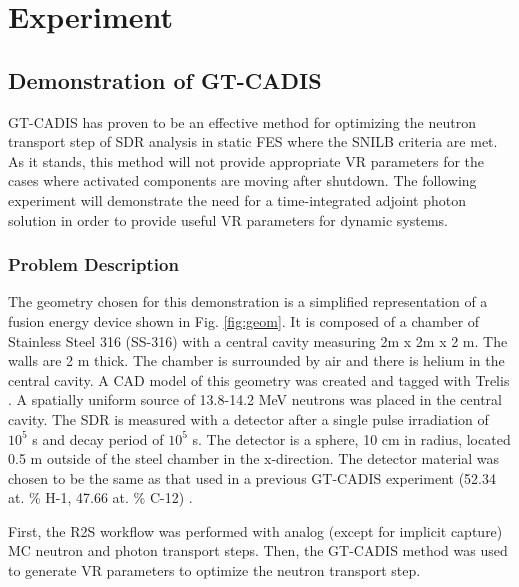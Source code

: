 \graphicspath{{/home/chelsea/prelim/src/figs}}

\chapter{Experiment} \label{ch:exp}

\section{Demonstration of GT-CADIS} \label{sec:gtcadis}
GT-CADIS has proven to be an effective method 
for optimizing the neutron transport step of 
SDR analysis in static FES where the SNILB criteria are met.  As it stands, this method
will not provide appropriate VR parameters for the cases where activated
components are moving
after shutdown.  The following experiment will demonstrate the need for a
time-integrated adjoint photon solution in order to provide useful VR parameters for
dynamic systems.

\subsection{Problem Description} \label{sec:description}
The geometry chosen for this demonstration is a simplified representation of a 
fusion energy device shown in Fig. \ref{fig:geom}.
It is composed of a chamber of Stainless Steel 316 (SS-316) with a central cavity measuring
2m x 2m x 2 m.  The walls are 2 m thick.  The chamber is surrounded by air and
there is helium in the central cavity.  A CAD model of this geometry was created and tagged
with Trelis \cite{trelis}.  A spatially uniform source of
13.8-14.2 MeV neutrons was placed in the central cavity. 
The SDR is measured with a detector after a single pulse irradiation of $10^5$ s and
decay period of $10^5$ s.  The detector is a sphere, 10 cm in radius, located 0.5
m outside of the steel chamber in the x-direction. The detector material was chosen to
be the same as that used in a previous GT-CADIS experiment (52.34 at. \% H-1,
47.66 at. \% C-12) \cite{gtcadis}.  

First, the R2S workflow was performed with analog (except for implicit capture)
MC neutron and photon transport steps.
Then, the GT-CADIS method was used to generate VR parameters
to optimize the neutron transport step.

